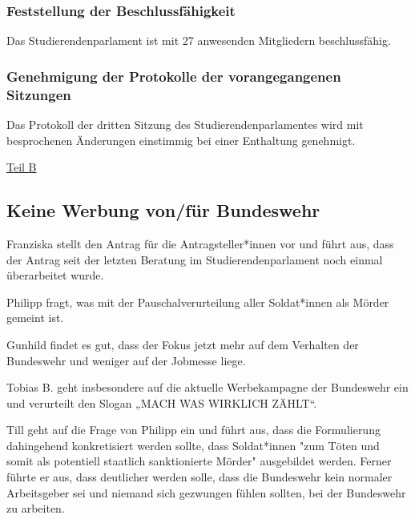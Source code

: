 \documentclass[ngerman,headheight=70pt]{scrartcl}
\begin{document}
    \subsubsection{Feststellung der Beschlussfähigkeit}

    Das Studierendenparlament ist mit 27 anwesenden Mitgliedern beschlussfähig.

    \subsubsection{Genehmigung der Protokolle der vorangegangenen Sitzungen}

    Das Protokoll der dritten Sitzung des Studierendenparlamentes wird mit
    besprochenen Änderungen einstimmig bei einer Enthaltung genehmigt.

    \newpage
    {\Large \underline{Teil B}}


    \subsection{Keine Werbung von/für Bundeswehr}

    Franziska stellt den Antrag für die Antragsteller*innen vor und führt aus, dass der
    Antrag seit der letzten Beratung im Studierendenparlament noch einmal
    überarbeitet wurde.

    Philipp fragt, was mit der Pauschalverurteilung aller Soldat*innen als Mörder
    gemeint ist.

    Gunhild findet es gut, dass der Fokus jetzt mehr auf dem Verhalten der Bundeswehr
    und weniger auf der Jobmesse liege.

    Tobias B. geht insbesondere auf die aktuelle Werbekampagne der Bundeswehr ein
    und verurteilt den Slogan „MACH WAS WIRKLICH ZÄHLT“.

    Till geht auf die Frage von Philipp ein und führt aus, dass die Formulierung
    dahingehend konkretisiert werden sollte, dass Soldat*innen "zum Töten und somit
    als potentiell staatlich sanktionierte Mörder" ausgebildet werden. Ferner
    führte er aus, dass deutlicher werden solle, dass die Bundeswehr kein normaler
    Arbeitsgeber sei und niemand sich gezwungen fühlen sollten, bei der Bundeswehr
    zu arbeiten.
\end{document}

